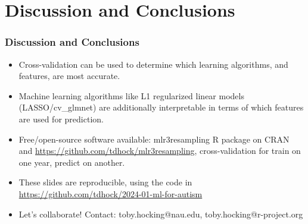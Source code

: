 \documentclass{beamer}
\begin{document}
\section{Discussion and Conclusions}

\begin{frame}
  \frametitle{Discussion and Conclusions}
  \begin{itemize}
  \item Cross-validation can be used to determine which learning
    algorithms, and features, are most accurate.
  \item Machine learning algorithms like L1 regularized linear models
    (LASSO/cv\_glmnet) are additionally interpretable in terms of
    which features are used for prediction.
  \item Free/open-source software available: mlr3resampling R package
    on CRAN and \url{https://github.com/tdhock/mlr3resampling},
    cross-validation for train on one year, predict on another.
\item These slides are reproducible, using the code in \url{https://github.com/tdhock/2024-01-ml-for-autism}
  \item Let's collaborate! Contact: toby.hocking@nau.edu,
    toby.hocking@r-project.org
  \end{itemize}
\end{frame}
\end{document}
